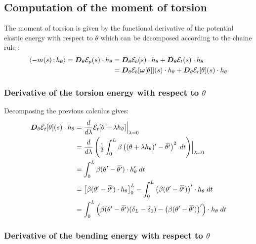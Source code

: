 \subsection{Computation of the moment of torsion}

The moment of torsion is given by the functional derivative of the potential elastic energy with respect to $\theta$ which can be decomposed according to the chaine rule :
\begin{equation}
	\begin{aligned}
	\langle -m(s)\,; h_\theta\rangle = \boldsymbol{D}_\theta\mathcal{E}_p(s)\cdot h_\theta 
	&= \boldsymbol{D}_\theta\mathcal{E}_b(s)\cdot h_\theta + \boldsymbol{D}_\theta\mathcal{E}_t(s)\cdot h_\theta \\
	&= \boldsymbol{D}_\theta\mathcal{E}_b[\boldsymbol{\omega}[\theta]](s)\cdot h_\theta + \boldsymbol{D}_\theta\mathcal{E}_t[\theta](s)\cdot h_\theta \\
	\end{aligned} 
\end{equation}

\subsubsection{Derivative of the torsion energy with respect to $\theta$}

Decomposing the previous calculus gives:
\begin{equation}
	\begin{aligned}
	\pdiffof{\theta}{\mathcal{E}_t[\theta]}{s}{h_\theta}
		&= \frac{d}{d\lambda} \mathcal{E}_t[\theta + \lambda h_\theta]\Bigr|_{\lambda = 0} \\
		&= \frac{d}{d\lambda}\left( \tfrac{1}{2} \int_{0}^{L} \beta\left((\theta + \lambda h_\theta)' -{\overbar{\theta'}}\right)^2 \;dt \right)\Bigr|_{\lambda = 0} \\
		&= \int_{0}^{L} \beta(\theta' -{\overbar{\theta'}}) \cdot h_\theta' \;dt \\
		&= \left[\beta(\theta' -{\overbar{\theta'}}) \cdot h_\theta\right]_0^L - \int_{0}^{L} \left(\beta(\theta' -{\overbar{\theta'}})\right)' \cdot h_\theta \;dt \\
		&= \int_{0}^{L} \left(\beta(\theta' -{\overbar{\theta'}})(\delta_L-\delta_0) - \left(\beta(\theta' -{\overbar{\theta'}})\right)'\right) \cdot h_\theta \;dt \\
	\end{aligned}
\end{equation}

\subsubsection{Derivative of the bending energy with respect to $\theta$}

